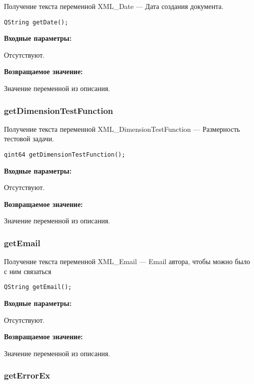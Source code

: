 Получение текста переменной  XML\_Date --- Дата создания документа.


\begin{lstlisting}[label=code_syntax_getDate,caption=Синтаксис]
QString getDate();
\end{lstlisting}

\textbf{Входные параметры:}

Отсутствуют.

\textbf{Возвращаемое значение:}

Значение переменной из описания.


\subsubsection{getDimensionTestFunction}\label{getDimensionTestFunction}

Получение текста переменной  XML\_DimensionTestFunction --- Размерность тестовой задачи.


\begin{lstlisting}[label=code_syntax_getDimensionTestFunction,caption=Синтаксис]
qint64 getDimensionTestFunction();
\end{lstlisting}

\textbf{Входные параметры:}

Отсутствуют.

\textbf{Возвращаемое значение:}

Значение переменной из описания.


\subsubsection{getEmail}\label{getEmail}

Получение текста переменной  XML\_Email --- Email автора, чтобы можно было с ним связаться


\begin{lstlisting}[label=code_syntax_getEmail,caption=Синтаксис]
QString getEmail();
\end{lstlisting}

\textbf{Входные параметры:}

Отсутствуют.

\textbf{Возвращаемое значение:}

Значение переменной из описания.


\subsubsection{getErrorEx}\label{getErrorEx}

